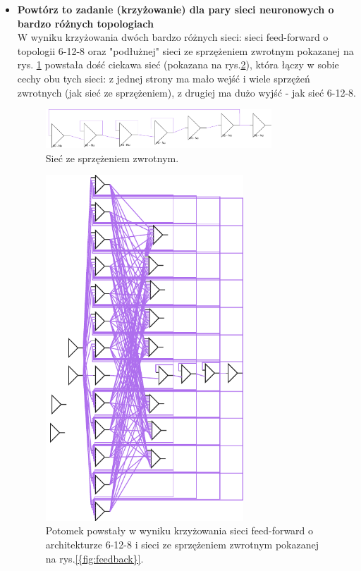 \begin{enumerate}
\begin{itemize}
		\item \textbf{Powtórz to zadanie (krzyżowanie) dla pary sieci neuronowych o bardzo różnych topologiach}
		\\W wyniku krzyżowania dwóch bardzo różnych sieci: sieci feed-forward o topologii 6-12-8 oraz "podłużnej" sieci ze sprzężeniem zwrotnym pokazanej na rys. \ref{fig:feedback} powstała dość ciekawa sieć (pokazana na rys.\ref{fig:dziecko_1111_6-12-8}), która łączy w sobie cechy obu tych sieci: z jednej strony ma mało wejść i wiele sprzężeń zwrotnych (jak sieć ze sprzężeniem), z drugiej ma dużo wyjść - jak sieć 6-12-8.

		\begin{figure}[h]
		\centering
		\includegraphics[width=0.8\textwidth]{dane/part2/zad3/feedback}
		\caption{Sieć ze sprzężeniem zwrotnym.\label{fig:feedback}}
		\end{figure}	

		\begin{figure}[h]
		\centering
		\includegraphics[width=0.7\textwidth]{dane/part2/zad3/dziecko_1111_6-12-8}
		\caption{Potomek powstały w wyniku krzyżowania sieci feed-forward o architekturze 6-12-8 i sieci ze sprzężeniem zwrotnym pokazanej na rys.\ref{{fig:feedback}}.\label{fig:dziecko_1111_6-12-8}}
		\end{figure}			
		
		
	\end{itemize}
\end{enumerate}